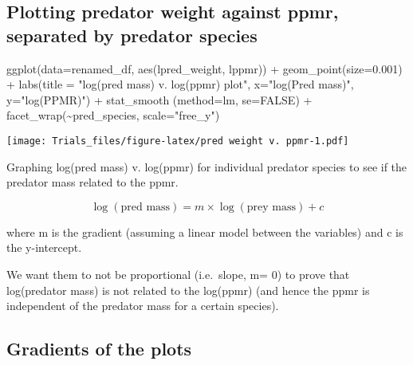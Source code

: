 \documentclass[
]{article}
\newenvironment{Shaded}{\begin{snugshade}}{\end{snugshade}}
\newcommand{\AttributeTok}[1]{\textcolor[rgb]{0.77,0.63,0.00}{#1}}
\newcommand{\ConstantTok}[1]{\textcolor[rgb]{0.00,0.00,0.00}{#1}}
\newcommand{\FloatTok}[1]{\textcolor[rgb]{0.00,0.00,0.81}{#1}}
\newcommand{\FunctionTok}[1]{\textcolor[rgb]{0.00,0.00,0.00}{#1}}
\newcommand{\NormalTok}[1]{#1}
\newcommand{\SpecialCharTok}[1]{\textcolor[rgb]{0.00,0.00,0.00}{#1}}
\newcommand{\StringTok}[1]{\textcolor[rgb]{0.31,0.60,0.02}{#1}}
\begin{document}
\hypertarget{plotting-predator-weight-against-ppmr-separated-by-predator-species}{%
\subsection{Plotting predator weight against ppmr, separated by predator
species}\label{plotting-predator-weight-against-ppmr-separated-by-predator-species}}

\begin{Shaded}
\begin{Highlighting}[]
\FunctionTok{ggplot}\NormalTok{(}\AttributeTok{data=}\NormalTok{renamed\_df, }\FunctionTok{aes}\NormalTok{(lpred\_weight, lppmr)) }\SpecialCharTok{+} 
  \FunctionTok{geom\_point}\NormalTok{(}\AttributeTok{size=}\FloatTok{0.001}\NormalTok{) }\SpecialCharTok{+}
  \FunctionTok{labs}\NormalTok{(}\AttributeTok{title =} \StringTok{"log(pred mass) v. log(ppmr) plot"}\NormalTok{, }\AttributeTok{x=}\StringTok{"log(Pred mass)"}\NormalTok{, }\AttributeTok{y=}\StringTok{"log(PPMR)"}\NormalTok{) }\SpecialCharTok{+} 
  \FunctionTok{stat\_smooth}\NormalTok{ (}\AttributeTok{method=}\StringTok{\textquotesingle{}lm\textquotesingle{}}\NormalTok{, }\AttributeTok{se=}\ConstantTok{FALSE}\NormalTok{) }\SpecialCharTok{+} 
  \FunctionTok{facet\_wrap}\NormalTok{(}\SpecialCharTok{\textasciitilde{}}\NormalTok{pred\_species, }\AttributeTok{scale=}\StringTok{"free\_y"}\NormalTok{)}
\end{Highlighting}
\end{Shaded}

\texttt{[image: Trials\_files/figure-latex/pred weight v. ppmr-1.pdf]}

Graphing log(pred mass) v. log(ppmr) for individual predator species to
see if the predator mass related to the ppmr.

\[
    \log(\text{pred mass}) = m \times \log (\text{prey mass}) + c
\]

where m is the gradient (assuming a linear model between the variables)
and c is the y-intercept.

We want them to not be proportional (i.e.~slope, m= 0) to prove that
log(predator mass) is not related to the log(ppmr) (and hence the ppmr
is independent of the predator mass for a certain species).

\hypertarget{gradients-of-the-plots}{%
\subsection{Gradients of the plots}\label{gradients-of-the-plots}}
\end{document}
